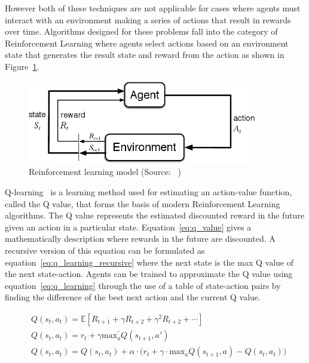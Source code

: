 However both of these techniques are not applicable for cases where agents must interact with an environment making a
series of actions that result in rewards over time. Algorithms designed for these problems fall into the category of
Reinforcement Learning where agents select actions based on an environment state that generates the result state and
reward from the action as shown in Figure~\ref{fig:reinforcement_learning}.

\begin{figure}[h]
    \centering
    \includegraphics[width=10cm]{figures/2_background_lit_figs/agent_env_interaction.png}
    \caption{Reinforcement learning model (Source: ~\cite{Sutton1998})}
    \label{fig:reinforcement_learning}
\end{figure}

Q-learning~\citep{watkins1992q-learning} is a learning method used for estimating an action-value function,
called the Q value, that forms the basis of modern Reinforcement Learning algorithms. The Q value represents the
estimated discounted reward in the future given an action in a particular state. Equation~\eqref{eq:q_value} gives a
mathematically description where rewards in the future are discounted. A recursive version of this equation can be
formulated as equation~\eqref{eq:q_learning_recursive} where the next state is the max Q value of the next state-action.
Agents can be trained to approximate the Q value using equation~\eqref{eq:q_learning} through the use of a table
of state-action pairs by finding the difference of the best next action and the current Q value.

\begin{align}
    & Q(s_t, a_t) = \mathbb{E} \left[R_{t+1} + \gamma R_{t+2} + \gamma^2 R_{t+2} + \cdots \right] \label{eq:q_value} \\
    & Q(s_t, a_t) = r_t + \gamma \text{max}_a^{'} Q(s_{t+1}, a') \label{eq:q_learning_recursive} \\
    & Q(s_t, a_t) = Q(s_t, a_t) + \alpha \cdot \big( r_t + \gamma \cdot \text{max}_a Q(s_{t+1} , a) - Q(s_t, a_t) \big) \label{eq:q_learning}
\end{align}

